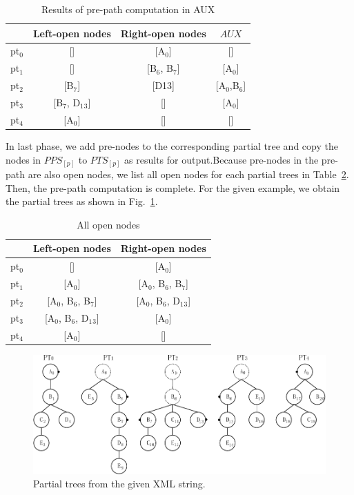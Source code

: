\begin{table}[t]
	\caption{Results of pre-path computation in AUX}
	\label{table:tempresult}
	\centering
	\begin{tabular}{c|ccc}
		\hline
		& Left-open nodes	& Right-open nodes & $AUX$\\
		\hline
		pt$_0$	& []			& [A$_0$]  & []\\  
		pt$_1$	& []			& [B$_6$, B$_7$] & [A$_0$] \\
		pt$_2$	& [B$_7$]			& [D13] &[A$_0$,B$_6$]\\
		pt$_3$	& [B$_7$, D$_1$$_3$]		& []  & [A$_0$]\\
		pt$_4$	& [A$_0$]			& [] &[]\\
		\hline
	\end{tabular}
\end{table}


In last phase, we add pre-nodes to the corresponding partial tree and copy the nodes in $PPS_{[p]}$ to $PTS_{[p]}$ as results for output.Because pre-nodes in the pre-path are also open nodes, we list all open nodes for each partial trees in Table~\ref{table:allopennodes}. Then, the pre-path computation is complete. For the given example, we obtain the partial trees as shown in Fig.~\ref{fig:partialtree2}.

\begin{table}[t]
	\caption{All open nodes}
	\label{table:allopennodes}
	\centering
	\begin{tabular}{c|cc}
	\hline
	& Left-open nodes	& Right-open nodes \\
	\hline
	pt$_0$	& []						& [A$_0$] \\
	pt$_1$	& [A$_0$]					& [A$_0$, B$_6$, B$_7$] \\
	pt$_2$	& [A$_0$, B$_6$, B$_7$]		& [A$_0$, B$_6$, D$_1$$_3$] \\
	pt$_3$	& [A$_0$, B$_6$, D$_1$$_3$]	& [A$_0$] \\
	pt$_4$	& [A$_0$]					& [] \\
	\hline
	\end{tabular}
\end{table} 


\begin{figure}[t]
	\centering\includegraphics[scale=.9]{partialtree/figures/fromWord-7.pdf}
	\caption{Partial trees from the given XML string.}
	\label{fig:partialtree2}
\end{figure}

